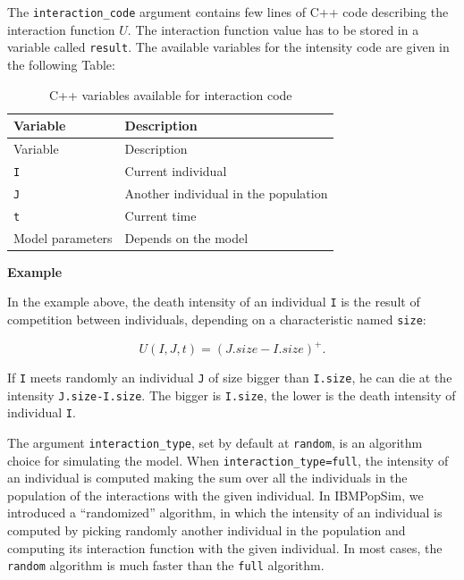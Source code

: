 The \texttt{interaction\_code} argument contains few lines of C++ code describing the interaction function \(U\). The interaction function value has to be stored in a variable called \texttt{result}. The available variables for the intensity code are given in the following Table:

\begin{longtable}[]{@{}ll@{}}
\caption{C++ variables available for interaction code}\tabularnewline
\toprule()
Variable & Description \\
\midrule()
\endfirsthead
\toprule()
Variable & Description \\
\midrule()
\endhead
\texttt{I} & Current individual \\
\texttt{J} & Another individual in the population \\
\texttt{t} & Current time \\
Model parameters & Depends on the model \\
\bottomrule()
\end{longtable}

\textbf{Example}

\begin{Shaded}
\begin{Highlighting}[]
\OtherTok{\textless{}{-}} 
\end{Highlighting}
\end{Shaded}

In the example above, the death intensity of an individual \texttt{I} is the result of competition between individuals, depending on a characteristic named \texttt{size}:

\[U(I,J,t) = (J.size - I.size)^+.\]

If \texttt{I} meets randomly an individual \texttt{J} of size bigger than \texttt{I.size}, he can die at the intensity \texttt{J.size-I.size}. The bigger is \texttt{I.size}, the lower is the death intensity of individual \texttt{I}.

The argument \texttt{interaction\_type}, set by default at \texttt{random}, is an algorithm choice for simulating the model.
When \texttt{interaction\_type=full}, the intensity of an individual is computed making the sum over all the individuals in the population of the interactions with the given individual. In IBMPopSim, we introduced a ``randomized'' algorithm, in which the intensity of an individual is computed by picking randomly another individual in the population and computing its interaction function with the given individual. In most cases, the \texttt{random} algorithm is much faster than the \texttt{full} algorithm.

